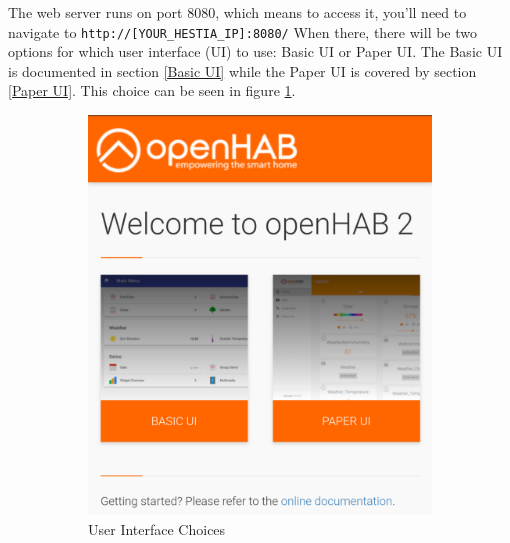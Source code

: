 The web server runs on port 8080, which means to access it, you'll need to
navigate to \texttt{http://[YOUR\_HESTIA\_IP]:8080/}  When there, there will
be two options for which user interface (UI) to use: Basic UI or Paper UI.
The Basic UI is documented in section \ref{Basic UI} while the Paper UI is
covered by section \ref{Paper UI}.  This choice can be seen in figure
\ref{fig:ui-choice}.

\begin{figure}
\centering
\begin{subfigure}{0.32\textwidth}
  \centering
  \includegraphics[width=.75\linewidth]{img/ui-choice.png}
  \caption{User Interface Choices}
  \label{fig:ui-choice}
\end{subfigure}%
\begin{subfigure}{0.33\textwidth}
  \centering

\end{subfigure}
\end{figure}
